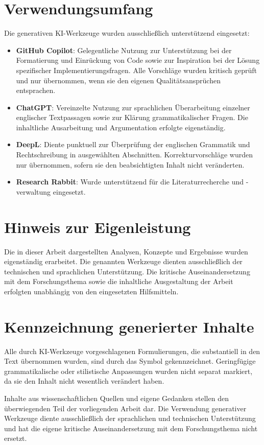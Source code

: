 \section*{Verwendungsumfang}

Die generativen KI-Werkzeuge wurden ausschließlich unterstützend eingesetzt:

\begin{itemize}
  \item \textbf{GitHub Copilot}: Gelegentliche Nutzung zur Unterstützung bei der Formatierung und Einrückung von Code sowie zur Inspiration bei der Lösung spezifischer Implementierungsfragen. Alle Vorschläge wurden kritisch geprüft und nur übernommen, wenn sie den eigenen Qualitätsansprüchen entsprachen.

  \item \textbf{ChatGPT}: Vereinzelte Nutzung zur sprachlichen Überarbeitung einzelner englischer Textpassagen sowie zur Klärung grammatikalischer Fragen. Die inhaltliche Ausarbeitung und Argumentation erfolgte eigenständig.

  \item \textbf{DeepL}: Diente punktuell zur Überprüfung der englischen Grammatik und Rechtschreibung in ausgewählten Abschnitten. Korrekturvorschläge wurden nur übernommen, sofern sie den beabsichtigten Inhalt nicht veränderten.

  \item \textbf{Research Rabbit}: Wurde unterstützend für die Literaturrecherche und -verwaltung eingesetzt.
\end{itemize}

\section*{Hinweis zur Eigenleistung}

Die in dieser Arbeit dargestellten Analysen, Konzepte und Ergebnisse wurden eigenständig erarbeitet. Die genannten Werkzeuge dienten ausschließlich der technischen und sprachlichen Unterstützung. Die kritische Auseinandersetzung mit dem Forschungsthema sowie die inhaltliche Ausgestaltung der Arbeit erfolgten unabhängig von den eingesetzten Hilfsmitteln.

\section*{Kennzeichnung generierter Inhalte}

Alle durch KI-Werkzeuge vorgeschlagenen Formulierungen, die substantiell in den Text übernommen wurden, sind durch das Symbol  gekennzeichnet. Geringfügige grammatikalische oder stilistische Anpassungen wurden nicht separat markiert, da sie den Inhalt nicht wesentlich verändert haben.

Inhalte aus wissenschaftlichen Quellen und eigene Gedanken stellen den überwiegenden Teil der vorliegenden Arbeit dar. Die Verwendung generativer Werkzeuge diente ausschließlich der sprachlichen und technischen Unterstützung und hat die eigene kritische Auseinandersetzung mit dem Forschungsthema nicht ersetzt.
